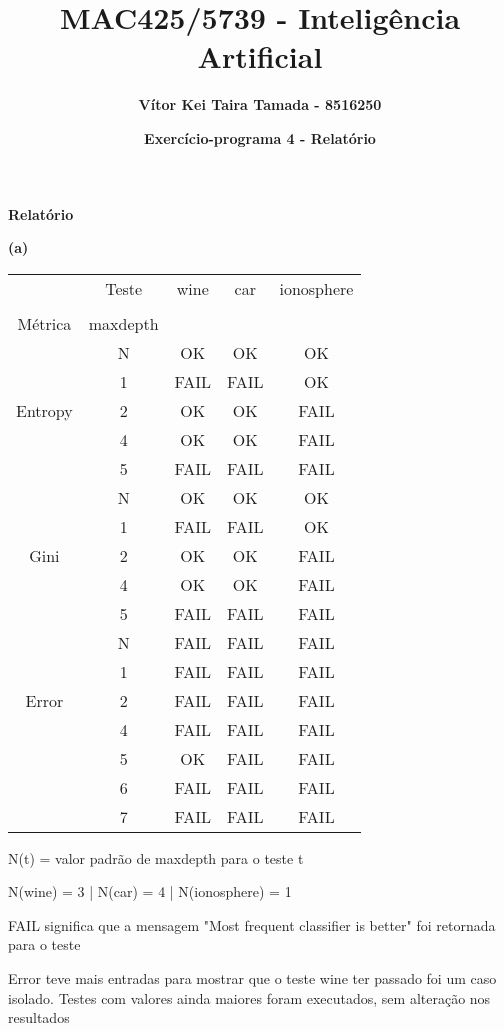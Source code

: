 \documentclass{article}
\title{\textbf{MAC425/5739 - Inteligência Artificial}}
\author{\textbf{Vítor Kei Taira Tamada - 8516250}}
\date{\textbf{Exercício-programa 4 - Relatório}}
\begin{document}
\maketitle

\textbf{\LARGE{Relatório}}

\quad \textbf{(a)}

\begin{center}
	\begin{tabular}{| c  c | c | c | c |}
		\hline
			& Teste & wine & car & ionosphere \\ 
			& & & & \\
			Métrica & maxdepth & & & \\ \hline
			
			& N & OK & OK & OK \\
			& 1 & FAIL & FAIL & OK \\
			Entropy & 2 & OK & OK & FAIL \\
			& 4 & OK & OK & FAIL \\
			& 5 & FAIL & FAIL & FAIL \\ \hline
			
			& N & OK & OK & OK \\
			& 1 & FAIL & FAIL & OK \\
			Gini & 2 & OK & OK & FAIL \\
			& 4 & OK & OK & FAIL \\
			& 5 & FAIL & FAIL & FAIL \\ \hline
			
			& N & FAIL & FAIL & FAIL \\
			& 1 & FAIL & FAIL & FAIL \\
			Error & 2 & FAIL & FAIL & FAIL \\
			& 4 & FAIL & FAIL & FAIL \\
			& 5 & OK & FAIL & FAIL \\
			& 6 & FAIL & FAIL & FAIL \\
			& 7 & FAIL & FAIL & FAIL \\ \hline
	\end{tabular}
	
	N(t) = valor padrão de maxdepth para o teste t
	
	N(wine) = 3 | N(car) = 4 | N(ionosphere) = 1
	
	\bigskip
	FAIL significa que a mensagem "Most frequent classifier is better" foi retornada para o teste
	
	\bigskip
	Error teve mais entradas para mostrar que o teste wine ter passado foi um caso isolado. Testes com valores ainda maiores foram executados, sem alteração nos resultados
\end{center}
\end{document}
